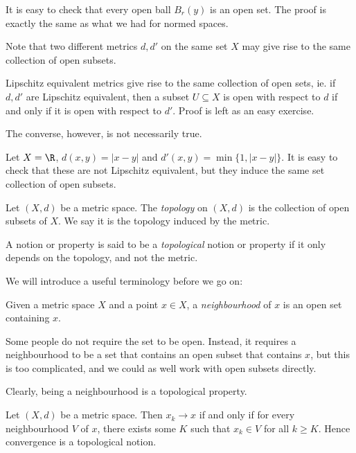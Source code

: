 \documentclass[a4paper]{article}
\begin{document}
It is easy to check that every open ball $B_r(y)$ is an open set. The proof is exactly the same as what we had for normed spaces.

Note that two different metrics $d, d'$ on the same set $X$ may give rise to the same collection of open subsets.
\begin{eg}
  Lipschitz equivalent metrics give rise to the same collection of open sets, ie. if $d, d'$ are Lipschitz equivalent, then a subset $U \subseteq X$ is open with respect to $d$ if and only if it is open with respect to $d'$. Proof is left as an easy exercise.
\end{eg}
The converse, however, is not necessarily true.
\begin{eg}
  Let $X = \R$, $d(x, y) = |x - y|$ and $d'(x, y) = \min\{1, |x - y|\}$. It is easy to check that these are not Lipschitz equivalent, but they induce the same set collection of open subsets.
\end{eg}

\begin{defi}[Topology]
  Let $(X, d)$ be a metric space. The \emph{topology} on $(X, d)$ is the collection of open subsets of $X$. We say it is the topology induced by the metric.
\end{defi}

\begin{defi}
  A notion or property is said to be a \emph{topological} notion or property if it only depends on the topology, and not the metric.
\end{defi}

We will introduce a useful terminology before we go on:

\begin{defi}[Neighbourhood]
  Given a metric space $X$ and a point $x \in X$, a \emph{neighbourhood} of $x$ is an open set containing $x$.
\end{defi}
Some people do not require the set to be open. Instead, it requires a neighbourhood to be a set that contains an open subset that contains $x$, but this is too complicated, and we could as well work with open subsets directly.

Clearly, being a neighbourhood is a topological property.

\begin{prop}
  Let $(X, d)$ be a metric space. Then $x_k \to x$ if and only if for every neighbourhood $V$ of $x$, there exists some $K$ such that $x_k \in V$ for all $k \geq K$. Hence convergence is a topological notion.
\end{prop}
\end{document}
